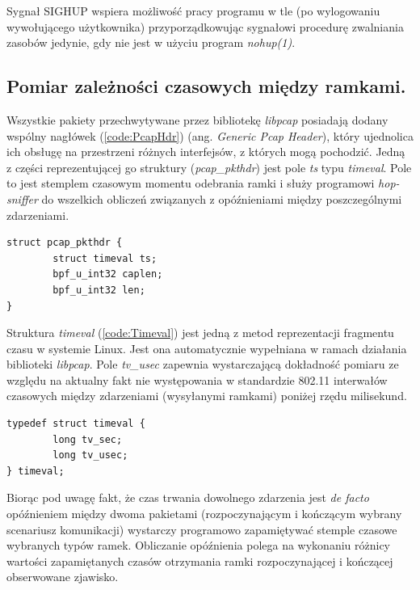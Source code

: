 Sygnał SIGHUP wspiera możliwość pracy programu w tle (po wylogowaniu wywołującego użytkownika) przyporządkowując sygnałowi procedurę zwalniania zasobów jedynie, gdy nie jest w użyciu program \emph{nohup(1)}. 

\subsection{Pomiar zależności czasowych między ramkami.} 

Wszystkie pakiety przechwytywane przez bibliotekę \emph{libpcap} posiadają dodany wspólny nagłówek (\ref{code:PcapHdr}) (ang. \emph{Generic Pcap Header}), który ujednolica ich obsługę na przestrzeni różnych interfejsów, z których mogą pochodzić. Jedną z części reprezentującej go struktury (\emph{pcap\_pkthdr}) jest pole \emph{ts} typu \emph{timeval}. Pole to jest stemplem czasowym momentu odebrania ramki i służy programowi \emph{hop-sniffer} do wszelkich obliczeń związanych z opóźnieniami między poszczególnymi zdarzeniami.

\begin{lstlisting}[frame=tb]
struct pcap_pkthdr {
        struct timeval ts;  
        bpf_u_int32 caplen; 
        bpf_u_int32 len;
}
\end{lstlisting}

Struktura \emph{timeval} (\ref{code:Timeval}) jest jedną z metod reprezentacji fragmentu czasu w systemie Linux. Jest ona automatycznie wypełniana w ramach działania biblioteki \emph{libpcap}. Pole \emph{tv\_usec} zapewnia wystarczającą dokładność pomiaru ze względu na aktualny fakt nie występowania w standardzie 802.11 interwałów czasowych między zdarzeniami (wysyłanymi ramkami) poniżej rzędu milisekund. 

\begin{lstlisting}[frame=tb]
typedef struct timeval {
        long tv_sec;
        long tv_usec;
} timeval;
\end{lstlisting}

Biorąc pod uwagę fakt, że czas trwania dowolnego zdarzenia jest \emph{de facto} opóźnieniem między dwoma pakietami (rozpoczynającym i kończącym wybrany scenariusz komunikacji) wystarczy programowo zapamiętywać stemple czasowe wybranych typów ramek. Obliczanie opóźnienia polega na wykonaniu różnicy wartości zapamiętanych czasów otrzymania ramki rozpoczynającej i kończącej obserwowane zjawisko. 

